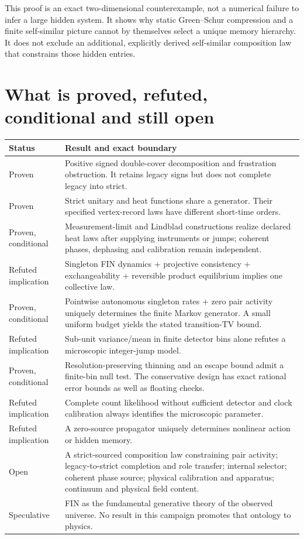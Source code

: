 \documentclass[11pt,a4paper]{article}
\begin{document}
This proof is an exact two-dimensional counterexample, not a numerical
failure to infer a large hidden system. It shows why static Green--Schur
compression and a finite self-similar picture cannot by themselves select
a unique memory hierarchy. It does not exclude an additional, explicitly
derived self-similar composition law that constrains those hidden entries.

\section{What is proved, refuted, conditional and still open}

\begin{longtable}{@{}p{}p{}@{}}
\toprule Status & Result and exact boundary\\\midrule\endhead
Proven & Positive signed double-cover decomposition and frustration
obstruction. It retains legacy signs but does not complete legacy into strict.\\[2mm]
Proven & Strict unitary and heat functions share a generator. Their specified
vertex-record laws have different short-time orders.\\[2mm]
Proven, conditional & Measurement-limit and Lindblad constructions realize
declared heat laws after supplying instruments or jumps; coherent phases,
dephasing and calibration remain independent.\\[2mm]
Refuted implication & Singleton FIN dynamics + projective consistency +
exchangeability + reversible product equilibrium implies one collective law.\\[2mm]
Proven, conditional & Pointwise autonomous singleton rates + zero pair
activity uniquely determines the finite Markov generator. A small uniform
budget yields the stated transition-TV bound.\\[2mm]
Refuted implication & Sub-unit variance/mean in finite detector bins alone
refutes a microscopic integer-jump model.\\[2mm]
Proven, conditional & Resolution-preserving thinning and an escape bound
admit a finite-bin null test. The conservative design has exact rational
error bounds as well as floating checks.\\[2mm]
Refuted implication & Complete count likelihood without sufficient detector
and clock calibration always identifies the microscopic parameter.\\[2mm]
Refuted implication & A zero-source propagator uniquely determines nonlinear
action or hidden memory.\\[2mm]
Open & A strict-sourced composition law constraining pair activity;
legacy-to-strict completion and role transfer; internal selector; coherent
phase source; physical calibration and apparatus; continuum and physical
field content.\\[2mm]
Speculative & FIN as the fundamental generative theory of the observed
universe. No result in this campaign promotes that ontology to physics.\\
\bottomrule
\end{longtable}
\end{document}
